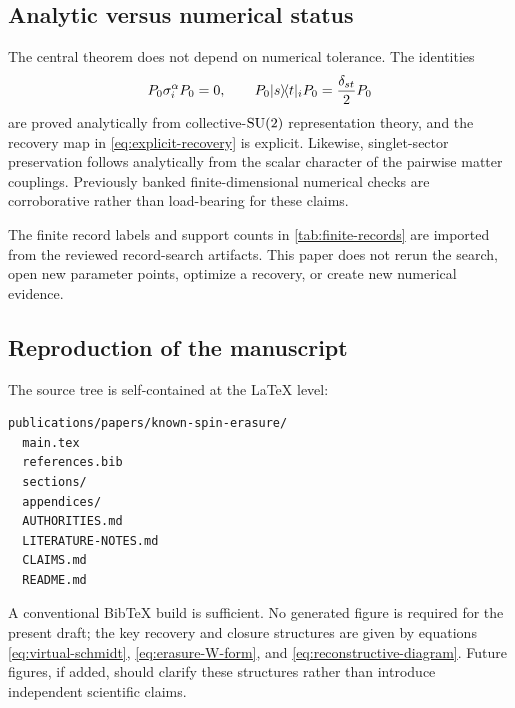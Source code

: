 \subsection{Analytic versus numerical status}

The central theorem does not depend on numerical tolerance.  The identities
\begin{equation}
  P_0\sigma_i^\alpha P_0=0,
  \qquad
  P_0\lvert s\rangle\!\langle t\rvert_iP_0=\frac{\delta_{st}}2P_0
\end{equation}
are proved analytically from collective-$\mathrm{SU}(2)$ representation theory, and the recovery map in \cref{eq:explicit-recovery} is explicit.  Likewise, singlet-sector preservation follows analytically from the scalar character of the pairwise matter couplings.  Previously banked finite-dimensional numerical checks are corroborative rather than load-bearing for these claims.

The finite record labels and support counts in \cref{tab:finite-records} are imported from the reviewed record-search artifacts.  This paper does not rerun the search, open new parameter points, optimize a recovery, or create new numerical evidence.

\subsection{Reproduction of the manuscript}

The source tree is self-contained at the LaTeX level:
\begin{verbatim}
publications/papers/known-spin-erasure/
  main.tex
  references.bib
  sections/
  appendices/
  AUTHORITIES.md
  LITERATURE-NOTES.md
  CLAIMS.md
  README.md
\end{verbatim}
A conventional BibTeX build is sufficient.  No generated figure is required for the present draft; the key recovery and closure structures are given by equations \eqref{eq:virtual-schmidt}, \eqref{eq:erasure-W-form}, and \eqref{eq:reconstructive-diagram}.  Future figures, if added, should clarify these structures rather than introduce independent scientific claims.
